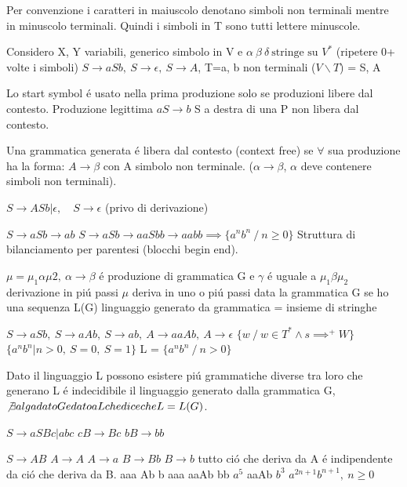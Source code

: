 \begin{tcolorbox}\begin{center}
Per convenzione i caratteri in maiuscolo denotano simboli non terminali mentre in minuscolo terminali. Quindi i simboli in T sono 
tutti lettere minuscole.
\end{center}\end{tcolorbox}

Considero X, Y variabili, generico simbolo in V e $\alpha\ \beta\ \delta\ \text{stringe su } V^*$ (ripetere 0+ volte i simboli)  
$S \rightarrow aSb,\ S\rightarrow \epsilon,\ S \rightarrow A$, T=a, b non terminali ($V\backslash T$) = S, A 

Lo start symbol \'e usato nella prima produzione solo se produzioni libere dal contesto.
Produzione legittima $aS\rightarrow b$ S a destra di una P non libera dal contesto.

Una grammatica generata \'e libera dal contesto (context free) se $\forall$ sua produzione ha la forma: $A\rightarrow \beta$ con A 
simbolo non terminale. ($\alpha \rightarrow \beta$, $\alpha$ deve contenere simboli non terminali).

$S \rightarrow ASb|\epsilon,\quad S\rightarrow \epsilon$ (privo di derivazione)

$S \rightarrow aSb \rightarrow ab$
$S \rightarrow aSb \rightarrow aaSbb \rightarrow aabb \implies \{a^nb^n\ / \ n \geq 0 \} $ Struttura di bilanciamento per parentesi (blocchi begin end).

$\mu = \mu_1 \alpha \mu2,\ \alpha \rightarrow \beta$ \'e produzione di grammatica G e $\gamma$ \'e uguale a $\mu_1 \beta \mu_2$
derivazione in pi\'u passi $\mu$ deriva in uno o pi\'u passi data la grammatica G se ho una sequenza L(G) linguaggio generato da grammatica = insieme di stringhe

$S \rightarrow aSb,\ S \rightarrow aAb,\ S \rightarrow ab,\ A \rightarrow aaAb,\ A \rightarrow \epsilon$
$\{w \ / \ w \in T^* \land s \implies^+ W\}$
$\{ a^n b^n| n > 0,\ S = 0,\ S = 1 \}$
L = $\{a^n b^n \ / \ n > 0\}$

Dato il linguaggio L possono esistere pi\'u grammatiche diverse tra loro che generano L \'e indecidibile il linguaggio generato dalla 
grammatica G, $\not\exists alga dato G e dato a L che dice che L = L(G)$.

$S \rightarrow aSBc|abc$
$cB \rightarrow Bc$
$bB \rightarrow bb$


$S \rightarrow AB$
$A \rightarrow A$
$A \rightarrow a$
$B \rightarrow Bb$
$B\rightarrow b$
tutto ci\'o che deriva da A \'e indipendente da ci\'o che deriva da B.
aaa Ab b
aaa aaAb bb
$a^5$ aaAb $b^3$
${a^{2n+1}b^{n+1},\ n \geq 0}$

